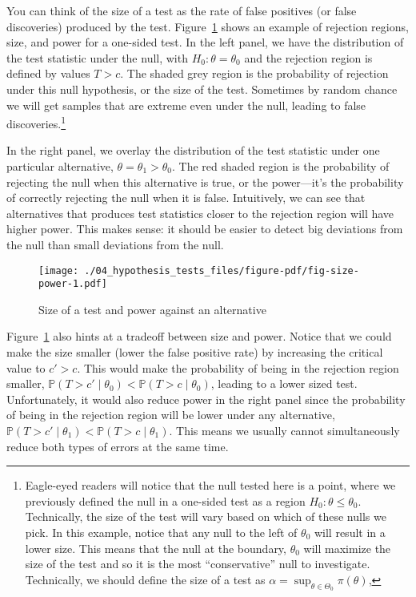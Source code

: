 \documentclass[
  letterpaper,
  DIV=11,
  numbers=noendperiod]{scrreprt}
\renewcommand{\P}{\mathbb{P}}
\theoremstyle{definition}
\theoremstyle{plain}
\theoremstyle{definition}
\theoremstyle{remark}
\begin{document}
You can think of the size of a test as the rate of false positives (or
false discoveries) produced by the test. Figure~\ref{fig-size-power}
shows an example of rejection regions, size, and power for a one-sided
test. In the left panel, we have the distribution of the test statistic
under the null, with \(H_0: \theta = \theta_0\) and the rejection region
is defined by values \(T > c\). The shaded grey region is the
probability of rejection under this null hypothesis, or the size of the
test. Sometimes by random chance we will get samples that are extreme
even under the null, leading to false discoveries.\footnote{Eagle-eyed
  readers will notice that the null tested here is a point, where we
  previously defined the null in a one-sided test as a region
  \(H_0: \theta \leq \theta_0\). Technically, the size of the test will
  vary based on which of these nulls we pick. In this example, notice
  that any null to the left of \(\theta_0\) will result in a lower size.
  This means that the null at the boundary, \(\theta_0\) will maximize
  the size of the test and so it is the most ``conservative'' null to
  investigate. Technically, we should define the size of a test as
  \(\alpha = \sup_{\theta \in \Theta_0} \pi(\theta)\),}

In the right panel, we overlay the distribution of the test statistic
under one particular alternative, \(\theta = \theta_1 > \theta_0\). The
red shaded region is the probability of rejecting the null when this
alternative is true, or the power---it's the probability of correctly
rejecting the null when it is false. Intuitively, we can see that
alternatives that produces test statistics closer to the rejection
region will have higher power. This makes sense: it should be easier to
detect big deviations from the null than small deviations from the null.

\begin{figure}

{\centering \texttt{[image: ./04\_hypothesis\_tests\_files/figure-pdf/fig-size-power-1.pdf]}

}

\caption{\label{fig-size-power}Size of a test and power against an
alternative}

\end{figure}

Figure~\ref{fig-size-power} also hints at a tradeoff between size and
power. Notice that we could make the size smaller (lower the false
positive rate) by increasing the critical value to \(c' > c\). This
would make the probability of being in the rejection region smaller,
\(\P(T > c' \mid \theta_0) < \P(T > c \mid \theta_0)\), leading to a
lower sized test. Unfortunately, it would also reduce power in the right
panel since the probability of being in the rejection region will be
lower under any alternative,
\(\P(T > c' \mid \theta_1) < \P(T > c \mid \theta_1)\). This means we
usually cannot simultaneously reduce both types of errors at the same
time.
\end{document}
